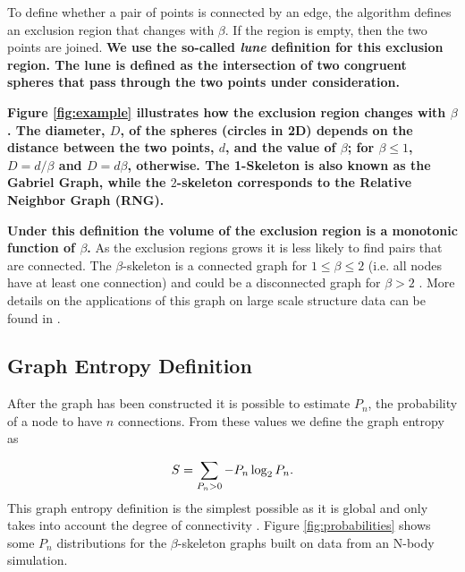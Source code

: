 \documentclass[fleqn,usenatbib]{mnras}
\begin{document}
To define whether a pair of points is connected by an edge, the
algorithm defines an exclusion region that changes with $\beta$.  
If the region is empty, then the two points are joined.
\textbf{We use the so-called \emph{lune} definition for this exclusion region.
The lune is defined as the intersection of two congruent spheres that
pass through the two points under consideration.}

\textbf{Figure \ref{fig:example} illustrates how the exclusion region changes
with $\beta$.
The diameter, $D$, of the spheres (circles in 2D) depends on the
distance between the two points, $d$, and the value of $\beta$; for
$\beta \leq 1$, $D=d/\beta$ and $D=d\beta$, otherwise.
The 1-Skeleton is also known as the Gabriel Graph, while the
$2$-skeleton corresponds to the Relative Neighbor Graph (RNG). }

\textbf{Under this definition the volume of the exclusion region is a
monotonic function of $\beta$.}
As the exclusion regions grows it is less likely to find pairs that are connected.
The $\beta$-skeleton is a connected graph for $1\leq \beta\leq 2$
(i.e. all nodes have at least
one connection) and could be a disconnected graph for $\beta>2$ \citep{bose2002spanning}.
More details on the applications of this graph on large scale structure data
can be found in \citep{2019MNRAS.485.5276F}.

\subsection{Graph Entropy Definition}

After the graph has been constructed it is possible to estimate $P_n$, the probability of 
a node to have $n$ connections.
From these values we define the graph entropy as

\begin{equation}
\centering
    S = \displaystyle\sum_{P_n>0}-P_n\log_2{P_n}.
    \label{ecuacionEntropia}
\end{equation}
%
This graph entropy definition is the simplest possible as it is global and only 
takes into account the degree of connectivity \citep{2012Entrp..14..559M}. 
Figure \ref{fig:probabilities} shows some $P_n$ distributions for the 
$\beta$-skeleton graphs built on data from an N-body simulation.
\end{document}
